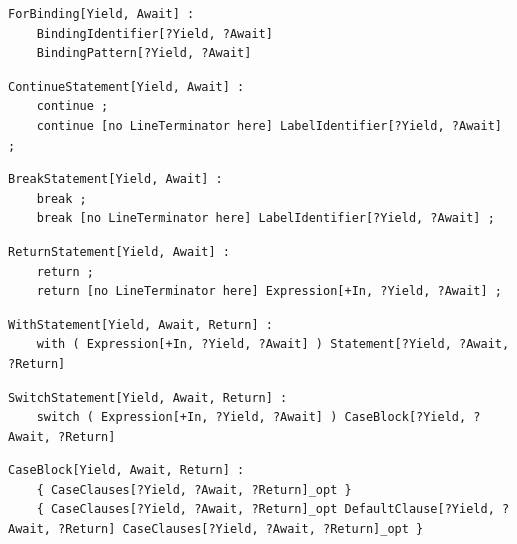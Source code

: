 \noindent\textbf{\texttt{}}\par
\begin{lstlisting}
ForBinding[Yield, Await] :
    BindingIdentifier[?Yield, ?Await]
    BindingPattern[?Yield, ?Await]
\end{lstlisting}

\noindent\textbf{\texttt{}}\par
\begin{lstlisting}
ContinueStatement[Yield, Await] :
    continue ;
    continue [no LineTerminator here] LabelIdentifier[?Yield, ?Await] ;
\end{lstlisting}

\noindent\textbf{\texttt{}}\par
\begin{lstlisting}
BreakStatement[Yield, Await] :
    break ;
    break [no LineTerminator here] LabelIdentifier[?Yield, ?Await] ;
\end{lstlisting}

\noindent\textbf{\texttt{}}\par
\begin{lstlisting}
ReturnStatement[Yield, Await] :
    return ;
    return [no LineTerminator here] Expression[+In, ?Yield, ?Await] ;
\end{lstlisting}

\noindent\textbf{\texttt{}}\par
\begin{lstlisting}
WithStatement[Yield, Await, Return] :
    with ( Expression[+In, ?Yield, ?Await] ) Statement[?Yield, ?Await, ?Return]
\end{lstlisting}

\noindent\textbf{\texttt{}}\par
\begin{lstlisting}
SwitchStatement[Yield, Await, Return] :
    switch ( Expression[+In, ?Yield, ?Await] ) CaseBlock[?Yield, ?Await, ?Return]
\end{lstlisting}

\noindent\textbf{\texttt{}}\par
\begin{lstlisting}
CaseBlock[Yield, Await, Return] :
    { CaseClauses[?Yield, ?Await, ?Return]_opt }
    { CaseClauses[?Yield, ?Await, ?Return]_opt DefaultClause[?Yield, ?Await, ?Return] CaseClauses[?Yield, ?Await, ?Return]_opt }
\end{lstlisting}

